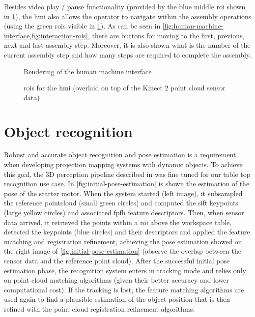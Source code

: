 Besides video play / pause functionality (provided by the blue middle \gls{roi} shown in \cref{fig:interaction-rois}), the \gls{hmi} also allows the operator to navigate within the assembly operations (using the green \glspl{roi} visible in \cref{fig:interaction-rois}). As can be seen in \cref{fig:human-machine-interface,fig:interaction-rois}, there are buttons for moving to the first, previous, next and last assembly step. Moreover, it is also shown what is the number of the current assembly step and how many steps are required to complete the assembly.

\begin{figure}[H]
	\begin{floatrow}[2]
		{\caption{Rendering of the human machine interface}\label{fig:human-machine-interface}}
		{\caption{\glspl{roi} for the \gls{hmi} (overlaid on top of the Kinect 2 point cloud sensor data)}\label{fig:interaction-rois}}
	\end{floatrow}
\end{figure}



\section{Object recognition}\label{sec:object-recognition}

Robust and accurate object recognition and pose estimation is a requirement when developing projection mapping systems with dynamic objects. To achieve this goal, the 3D perception pipeline described in \cite{Costa2016} was fine tuned for our table top recognition use case. In \cref{fig:initial-pose-estimation} is shown the estimation of the pose of the starter motor. When the system started (left image), it subsampled the reference pointcloud (small green circles) and computed the \gls{sift} \cite{Lowe2004} keypoints (large yellow circles) and associated \gls{fpfh} \cite{Rusu2009} feature descriptors. Then, when sensor data arrived, it retrieved the points within a \gls{roi} above the workspace table, detected the keypoints (blue circles) and their descriptors and applied the feature matching and registration refinement, achieving the pose estimation showed on the right image of \cref{fig:initial-pose-estimation} (observe the overlap between the sensor data and the reference point cloud). After the successful initial pose estimation phase, the recognition system enters in tracking mode and relies only on point cloud matching algorithms (given their better accuracy and lower computational cost). If the tracking is lost, the feature matching algorithms are used again to find a plausible estimation of the object position that is then refined with the point cloud registration refinement algorithms.


